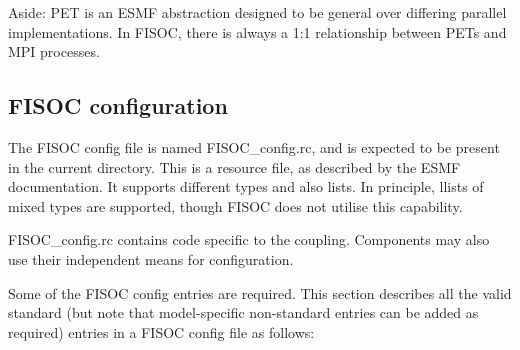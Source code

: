 \documentclass[12pt]{article}
\begin{document}
Aside: PET is an ESMF abstraction designed to be general over differing parallel implementations. 
In FISOC, there is always a 1:1 relationship between PETs and MPI processes. 


\subsection{FISOC configuration}
\label{sec:config}

The FISOC config file is named FISOC\_config.rc, and is expected to be present 
in the current directory.  
This is a resource file, as described by the 
ESMF documentation.  It supports different types and also lists. 
In principle, llists of mixed types are supported, though FISOC does not utilise this capability.

FISOC\_config.rc contains code specific to the coupling.  Components may also use their 
independent means for configuration.

Some of the FISOC config entries are required.
This section describes all the valid standard (but note that model-specific non-standard entries 
can be added as required) entries in a FISOC config file as follows:
\end{document}
